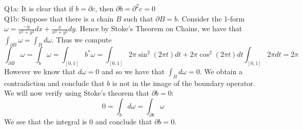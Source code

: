 \documentclass[letterpaper]{article}
\newcommand{\bd}{\partial}
\begin{document}
\noindent Q1a: It is clear that if $b=\bd c$, then $\bd b = \bd^2c =0$ 
\newline \\ Q1b: Suppose that there is a chain $B$ such that $\bd B = b$. Consider the 1-form $\omega = \frac{-y}{x^2+y^2}dx + \frac{x}{x^2+y^2}dy$. Hence by Stoke's Theorem on Chains, we have that $\int_{\bd B} \omega = \int_{B} d\omega $. Thus we compute $$\int_{\bd B} \omega = \int_{b} \omega = \int_{[0,1]} b^{*}\omega = \int_{[0,1]} 2\pi \sin^2(2\pi t) dt + 2\pi \cos^2(2\pi t) dt \int_{[0,1]} 2\pi dt = 2\pi$$
However we know that $d\omega=0$ and so we have that $\int_{B}d\omega =0$. We obtain a contradiction and conclude that $b$ is not in the image of the boundary operator. We will now verify using Stoke's theorem that $\bd b=0$: 
$$0= \int_{b}d\omega = \int_{\bd b}\omega$$ We see that the integral is 0 and conclude that $\bd b=0$. 
\end{document}
